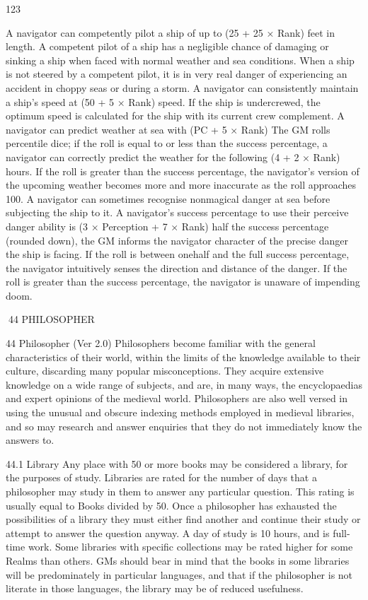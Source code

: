 \documentclass[a4paper]{article}
\begin{document}
\begin{multicols}{3}
123

A navigator can competently pilot a ship of up
to (25 + 25 × Rank) feet in length.
A competent pilot of a ship has a negligible chance
of damaging or sinking a ship when faced with
normal weather and sea conditions. When a ship is
not steered by a competent pilot, it is in very real
danger of experiencing an accident in choppy seas
or during a storm.
A navigator can consistently maintain a ship’s
speed at (50 + 5 × Rank)%
speed.
If the ship is undercrewed, the optimum speed is
calculated for the ship with its current crew complement.
A navigator can predict weather at sea with (PC
+ 5 × Rank)%
The GM rolls percentile dice; if the roll is equal to
or less than the success percentage, a navigator can
correctly predict the weather for the following (4 +
2 × Rank) hours. If the roll is greater than the success percentage, the navigator’s version of the
upcoming weather becomes more and more inaccurate as the roll approaches 100.
A navigator can sometimes recognise nonmagical danger at sea before subjecting the ship
to it.
A navigator’s success percentage to use their perceive danger ability is (3 × Perception + 7 ×
Rank)%
half the success percentage (rounded down), the
GM informs the navigator character of the precise
danger the ship is facing. If the roll is between onehalf and the full success percentage, the navigator
intuitively senses the direction and distance of the
danger. If the roll is greater than the success percentage, the navigator is unaware of impending
doom.

44 PHILOSOPHER

44 Philosopher (Ver 2.0)
Philosophers become familiar with the general
characteristics of their world, within the limits of
the knowledge available to their culture, discarding
many popular misconceptions. They acquire extensive knowledge on a wide range of subjects, and
are, in many ways, the encyclopaedias and expert
opinions of the medieval world. Philosophers are
also well versed in using the unusual and obscure
indexing methods employed in medieval libraries,
and so may research and answer enquiries that they
do not immediately know the answers to.

44.1 Library
Any place with 50 or more books may be considered a library, for the purposes of study. Libraries
are rated for the number of days that a philosopher
may study in them to answer any particular question. This rating is usually equal to Books divided
by 50. Once a philosopher has exhausted the possibilities of a library they must either find another
and continue their study or attempt to answer the
question anyway. A day of study is 10 hours, and is
full-time work. Some libraries with specific collections may be rated higher for some Realms than
others. GMs should bear in mind that the books in
some libraries will be predominately in particular
languages, and that if the philosopher is not literate
in those languages, the library may be of reduced
usefulness.


\end{multicols}
\end{document}
